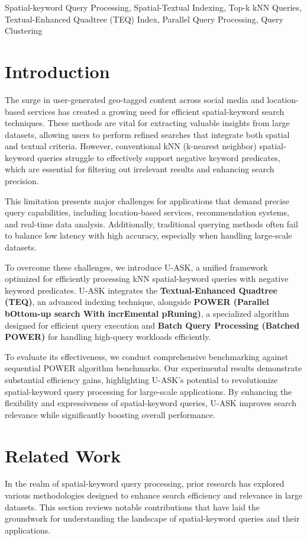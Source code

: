 \documentclass[conference]{IEEEtran}
\begin{document}
\begin{IEEEkeywords}
Spatial-keyword Query Processing, Spatial-Textual Indexing, Top-k kNN Queries, Textual-Enhanced Quadtree (TEQ) Index, Parallel Query Processing, Query Clustering
\end{IEEEkeywords}

\section{Introduction}
The surge in user-generated geo-tagged content across social media and location-based services has created a growing need for efficient spatial-keyword search techniques. These methods are vital for extracting valuable insights from large datasets, allowing users to perform refined searches that integrate both spatial and textual criteria. However, conventional kNN (k-nearest neighbor) spatial-keyword queries struggle to effectively support negative keyword predicates, which are essential for filtering out irrelevant results and enhancing search precision.

This limitation presents major challenges for applications that demand precise query capabilities, including location-based services, recommendation systems, and real-time data analysis. Additionally, traditional querying methods often fail to balance low latency with high accuracy, especially when handling large-scale datasets.

To overcome these challenges, we introduce U-ASK, a unified framework optimized for efficiently processing kNN spatial-keyword queries with negative keyword predicates. U-ASK integrates the \textbf{Textual-Enhanced Quadtree (TEQ)}, an advanced indexing technique, alongside \textbf{POWER (Parallel bOttom-up search With incrEmental pRuning)}, a specialized algorithm designed for efficient query execution and \textbf{Batch Query Processing (Batched POWER)} for handling high-query workloads efficiently. 

To evaluate its effectiveness, we conduct comprehensive benchmarking against sequential POWER algorithm benchmarks. Our experimental results demonstrate substantial efficiency gains, highlighting U-ASK's potential to revolutionize spatial-keyword query processing for large-scale applications. By enhancing the flexibility and expressiveness of spatial-keyword queries, U-ASK improves search relevance while significantly boosting overall performance.

\section{Related Work}
In the realm of spatial-keyword query processing, prior research has explored various methodologies designed to enhance search efficiency and relevance in large datasets. This section reviews notable contributions that have laid the groundwork for understanding the landscape of spatial-keyword queries and their applications.
\end{document}
